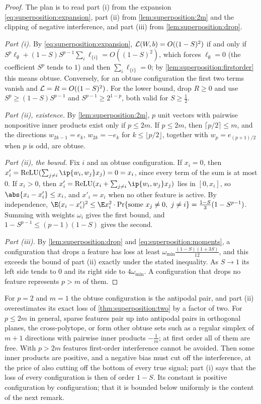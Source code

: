 \begin{refsection}
\begin{proof}
The plan is to read part (i) from the expansion \eqref{eq:superposition:expansion}, part (ii) from \cref{lem:superposition:2m} and the clipping of negative interference, and part (iii) from \cref{lem:superposition:drop}.

\emph{Part (i).} By \eqref{eq:superposition:expansion}, $\mathcal{L}(W,b)=O((1-S)^2)$ if and only if $S^p\ell_\emptyset+(1-S)S^{p-1}\sum_i\ell_{\{i\}}=O((1-S)^2)$, which forces $\ell_\emptyset=0$ (the coefficient $S^p$ tends to $1$) and then $\sum_i\ell_{\{i\}}=0$; by \cref{lem:superposition:firstorder} this means obtuse. Conversely, for an obtuse configuration the first two terms vanish and $\mathcal{L}=R=O((1-S)^2)$. For the lower bound, drop $R\ge0$ and use $S^p\ge(1-S)S^{p-1}$ and $S^{p-1}\ge2^{1-p}$, both valid for $S\ge\frac12$.

\emph{Part (ii), existence.} By \cref{lem:superposition:2m}, $p$ unit vectors with pairwise nonpositive inner products exist only if $p\le2m$. If $p\le2m$, then $\lceil p/2\rceil\le m$, and the directions $w_{2k-1}=e_k$, $w_{2k}=-e_k$ for $k\le\lfloor p/2\rfloor$, together with $w_p=e_{(p+1)/2}$ when $p$ is odd, are obtuse.

\emph{Part (ii), the bound.} Fix $i$ and an obtuse configuration. If $x_i=0$, then $x'_i=\relu(\sum_{j\ne i}\ip{w_i,w_j}x_j)=0=x_i$, since every term of the sum is at most $0$. If $x_i>0$, then $x'_i=\relu(x_i+\sum_{j\ne i}\ip{w_i,w_j}x_j)$ lies in $[0,x_i]$, so $\abs{x_i-x'_i}\le x_i$, and $x'_i=x_i$ when no other feature is active. By independence, $\E(x_i-x'_i)^2\le\E x_i^2\cdot\Pr\{\text{some }x_j\ne0,\ j\ne i\}=\frac{1-S}3(1-S^{p-1})$. Summing with weights $\omega_i$ gives the first bound, and $1-S^{p-1}\le(p-1)(1-S)$ gives the second.

\emph{Part (iii).} By \cref{lem:superposition:drop} and \eqref{eq:superposition:moments}, a configuration that drops a feature has loss at least $\omega_{\min}\frac{(1-S)(1+3S)}{12}$, and this exceeds the bound of part (ii) exactly under the stated inequality. As $S\to1$ its left side tends to $0$ and its right side to $4\omega_{\min}$. A configuration that drops no feature represents $p>m$ of them.
\end{proof}

For $p=2$ and $m=1$ the obtuse configuration is the antipodal pair, and part (ii) overestimates its exact loss of \cref{thm:superposition:two} by a factor of two. For $p\le2m$ in general, sparse features pair up into antipodal pairs in orthogonal planes, the cross-polytope, or form other obtuse sets such as a regular simplex of $m+1$ directions with pairwise inner products $-\frac1m$; at first order all of them are free. With $p>2m$ features first-order interference cannot be avoided. Then some inner products are positive, and a negative bias must cut off the interference, at the price of also cutting off the bottom of every true signal; part (i) says that the loss of every configuration is then of order $1-S$. Its constant is positive configuration by configuration; that it is bounded below uniformly is the content of the next remark.


\end{refsection}
